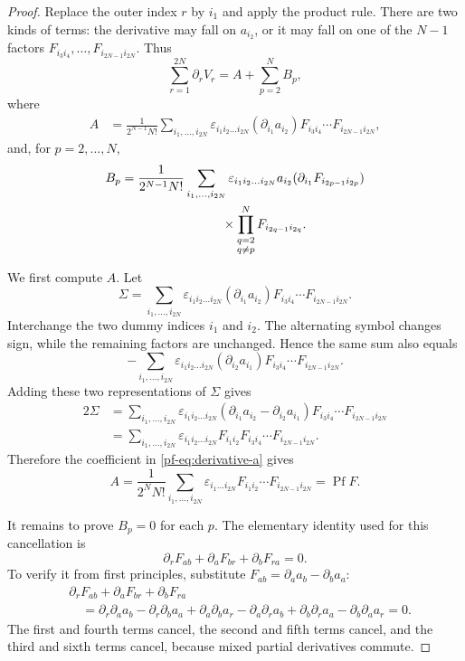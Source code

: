 \documentclass[11pt,reqno]{amsart}
\numberwithin{equation}{section}
\theoremstyle{definition}
\theoremstyle{remark}
\newcommand{\Pf}{\operatorname{Pf}}
\begin{document}
\begin{proof}
Replace the outer index $r$ by $i_1$ and apply the product rule.  There are
two kinds of terms: the derivative may fall on $a_{i_2}$, or it may fall
on one of the $N-1$ factors
$F_{i_3i_4},\ldots,F_{i_{2N-1}i_{2N}}$.  Thus
\[
 \sum_{r=1}^{2N}\partial_rV_r=A+\sum_{p=2}^N B_p,
\]
where
\begin{align}
 A
 &=\frac{1}{2^{N-1}N!}
 \sum_{i_1,\ldots,i_{2N}}
 \varepsilon_{i_1i_2\ldots i_{2N}}
 (\partial_{i_1}a_{i_2})
 F_{i_3i_4}\cdots F_{i_{2N-1}i_{2N}},
 \label{pf-eq:derivative-a}
\end{align}
and, for $p=2,\ldots,N$,
\begin{align*}
 B_p
 &=\frac{1}{2^{N-1}N!}
 \sum_{i_1,\ldots,i_{2N}}
 \varepsilon_{i_1i_2\ldots i_{2N}}a_{i_2}
 (\partial_{i_1}F_{i_{2p-1}i_{2p}})\\
 &\hspace{28mm}\times
 \prod_{\substack{q=2\\q\ne p}}^N
 F_{i_{2q-1}i_{2q}}.
\end{align*}

We first compute $A$.  Let
\[
 \Sigma=
 \sum_{i_1,\ldots,i_{2N}}
 \varepsilon_{i_1i_2\ldots i_{2N}}
 (\partial_{i_1}a_{i_2})
 F_{i_3i_4}\cdots F_{i_{2N-1}i_{2N}}.
\]
Interchange the two dummy indices $i_1$ and $i_2$.  The alternating symbol
changes sign, while the remaining factors are unchanged.  Hence the same
sum also equals
\[
 -\sum_{i_1,\ldots,i_{2N}}
 \varepsilon_{i_1i_2\ldots i_{2N}}
 (\partial_{i_2}a_{i_1})
 F_{i_3i_4}\cdots F_{i_{2N-1}i_{2N}}.
\]
Adding these two representations of $\Sigma$ gives
\begin{align*}
 2\Sigma
 &=\sum_{i_1,\ldots,i_{2N}}
 \varepsilon_{i_1i_2\ldots i_{2N}}
 (\partial_{i_1}a_{i_2}-\partial_{i_2}a_{i_1})
 F_{i_3i_4}\cdots F_{i_{2N-1}i_{2N}}\\
 &=\sum_{i_1,\ldots,i_{2N}}
 \varepsilon_{i_1i_2\ldots i_{2N}}
 F_{i_1i_2}F_{i_3i_4}\cdots F_{i_{2N-1}i_{2N}}.
\end{align*}
Therefore the coefficient in \eqref{pf-eq:derivative-a} gives
\[
 A=\frac{1}{2^NN!}
 \sum_{i_1,\ldots,i_{2N}}
 \varepsilon_{i_1\ldots i_{2N}}
 F_{i_1i_2}\cdots F_{i_{2N-1}i_{2N}}
 =\Pf F.
\]

It remains to prove $B_p=0$ for each $p$.  The elementary identity used for
this cancellation is
\begin{equation}\label{pf-eq:bianchi}
 \partial_rF_{ab}+\partial_aF_{br}+\partial_bF_{ra}=0.
\end{equation}
To verify it from first principles, substitute
$F_{ab}=\partial_aa_b-\partial_ba_a$:
\begin{align*}
 &\partial_rF_{ab}+\partial_aF_{br}+\partial_bF_{ra}\\
 &\quad=
 \partial_r\partial_aa_b-\partial_r\partial_ba_a
 +\partial_a\partial_ba_r-\partial_a\partial_ra_b
 +\partial_b\partial_ra_a-\partial_b\partial_aa_r=0.
\end{align*}
The first and fourth terms cancel, the second and fifth terms cancel, and
the third and sixth terms cancel, because mixed partial derivatives
commute.


\end{proof}
\end{document}
